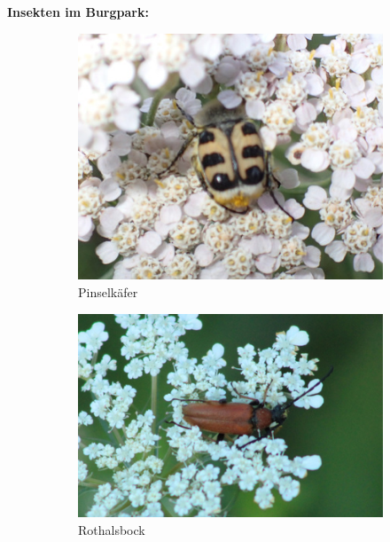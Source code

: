\documentclass[10pt]{article}
\begin{document}
\newpage
\textbf{Insekten im Burgpark:}

\begin{figure}[h!]
  \centering
  \begin{subfigure}[b]{0.41\linewidth}
    \includegraphics[width=\linewidth]{img/pinselkaefer.jpg}
    \caption{Pinselkäfer}
  \end{subfigure}
  \begin{subfigure}[b]{0.50\linewidth}
    \includegraphics[width=\linewidth]{img/schmalbock.jpg}
    \caption{Rothalsbock}
  \end{subfigure}
  \begin{subfigure}[b]{0.48\linewidth}

\end{subfigure}
\end{figure}
\end{document}
